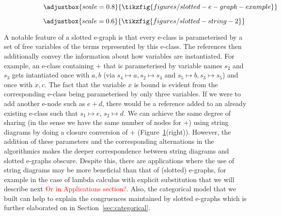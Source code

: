 \begin{figure}[t!]
	\begin{subfigure}[t]{0.45\linewidth}
\[
\adjustbox{scale=0.8}{
\tikzfig{figures/slotted-e-graph-example}
}
\]
	\end{subfigure}
	\hfill
\begin{subfigure}[t]{0.45\linewidth}
\[
\adjustbox{scale=0.6}{
\tikzfig{figures/slotted-string-2}
}
\]

\end{subfigure}
	\caption{}
	\label{fig:slotted}
\end{figure}

A notable feature of a slotted e-graph is that every e-class is parameterised by a set of free variables of the terms represented by this e-class.
The references then additionally convey the information about how variables are instantiated.
For example, an e-class containing $+$ that is parameterised by variable names $s_2$ and $s_3$ gets intantiated once with $a,b$ (via $s_4 \mapsto a, s_2 \mapsto s_4$ and $s_5 \mapsto b, s_3 \mapsto s_5$) and once  with $x,c$.
The fact that the variable $x$ is bound is evident from the corresponding e-class being parameterised by only three variables.
If we were to add another e-node such as $e + d$, there would be a reference added to an already existing e-class such that $s_1 \mapsto e$, $s_2 \mapsto d$.
We can achieve the same degree of sharing (in the sense we have the same number of nodes for $+$) using string diagrams by doing a closure conversion of $+$ (Figure~\ref{fig:slotted}(right)).
However, the addition of these parameters and the corresponding alternations in the algorithmics makes the deeper correspondence between string diagrams and slotted e-graphs obscure.
Despite this, there are applications where the use of string diagrams may be more beneficial than that of (slotted) e-graphs, for example in the case of lambda calculus with explicit substitution that we will describe next \textcolor{red}{Or in Applications section?}.
Also, the categorical model that we built can help to explain the congruences maintained by slotted e-graphs which is further elaborated on in Section~\ref{sec:categorical}.


